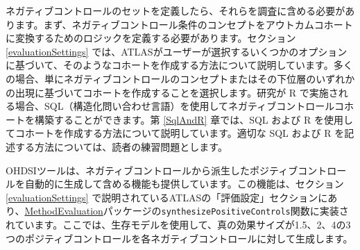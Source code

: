 \documentclass[
  11pt]{book}
\theoremstyle{definition}
\theoremstyle{definition}
\theoremstyle{definition}
\theoremstyle{definition}
\theoremstyle{remark}
\begin{document}
ネガティブコントロールのセットを定義したら、それらを調査に含める必要があります。まず、ネガティブコントロール条件のコンセプトをアウトカムコホートに変換するためのロジックを定義する必要があります。セクション \ref{evaluationSettings} では、ATLASがユーザーが選択するいくつかのオプションに基づいて、そのようなコホートを作成する方法について説明しています。多くの場合、単にネガティブコントロールのコンセプトまたはその下位層のいずれかの出現に基づいてコホートを作成することを選択します。研究が R で実施される場合、SQL（構造化問い合わせ言語）を使用してネガティブコントロールコホートを構築することができます。第 \ref{SqlAndR} 章では、SQL および R を使用してコホートを作成する方法について説明しています。適切な SQL および R を記述する方法については、読者の練習問題とします。

OHDSIツールは、ネガティブコントロールから派生したポジティブコントロールを自動的に生成して含める機能も提供しています。この機能は、セクション \ref{evaluationSettings} で説明されているATLASの「評価設定」セクションにあり、\href{https://ohdsi.github.io/MethodEvaluation/}{MethodEvaluation}パッケージの\texttt{synthesizePositiveControls}関数に実装されています。ここでは、生存モデルを使用して、真の効果サイズが1.5、2、4の3つのポジティブコントロールを各ネガティブコントロールに対して生成します。
\end{document}
